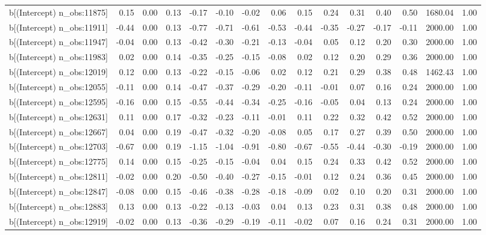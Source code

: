 \begin{table}[ht]
\begin{tabular}{rrrrrrrrrrrrrrr}
  b[(Intercept) n\_obs:11875] & 0.15 & 0.00 & 0.13 & -0.17 & -0.10 & -0.02 & 0.06 & 0.15 & 0.24 & 0.31 & 0.40 & 0.50 & 1680.04 & 1.00 \\ 
  b[(Intercept) n\_obs:11911] & -0.44 & 0.00 & 0.13 & -0.77 & -0.71 & -0.61 & -0.53 & -0.44 & -0.35 & -0.27 & -0.17 & -0.11 & 2000.00 & 1.00 \\ 
  b[(Intercept) n\_obs:11947] & -0.04 & 0.00 & 0.13 & -0.42 & -0.30 & -0.21 & -0.13 & -0.04 & 0.05 & 0.12 & 0.20 & 0.30 & 2000.00 & 1.00 \\ 
  b[(Intercept) n\_obs:11983] & 0.02 & 0.00 & 0.14 & -0.35 & -0.25 & -0.15 & -0.08 & 0.02 & 0.12 & 0.20 & 0.29 & 0.36 & 2000.00 & 1.00 \\ 
  b[(Intercept) n\_obs:12019] & 0.12 & 0.00 & 0.13 & -0.22 & -0.15 & -0.06 & 0.02 & 0.12 & 0.21 & 0.29 & 0.38 & 0.48 & 1462.43 & 1.00 \\ 
  b[(Intercept) n\_obs:12055] & -0.11 & 0.00 & 0.14 & -0.47 & -0.37 & -0.29 & -0.20 & -0.11 & -0.01 & 0.07 & 0.16 & 0.24 & 2000.00 & 1.00 \\ 
  b[(Intercept) n\_obs:12595] & -0.16 & 0.00 & 0.15 & -0.55 & -0.44 & -0.34 & -0.25 & -0.16 & -0.05 & 0.04 & 0.13 & 0.24 & 2000.00 & 1.00 \\ 
  b[(Intercept) n\_obs:12631] & 0.11 & 0.00 & 0.17 & -0.32 & -0.23 & -0.11 & -0.01 & 0.11 & 0.22 & 0.32 & 0.42 & 0.52 & 2000.00 & 1.00 \\ 
  b[(Intercept) n\_obs:12667] & 0.04 & 0.00 & 0.19 & -0.47 & -0.32 & -0.20 & -0.08 & 0.05 & 0.17 & 0.27 & 0.39 & 0.50 & 2000.00 & 1.00 \\ 
  b[(Intercept) n\_obs:12703] & -0.67 & 0.00 & 0.19 & -1.15 & -1.04 & -0.91 & -0.80 & -0.67 & -0.55 & -0.44 & -0.30 & -0.19 & 2000.00 & 1.00 \\ 
  b[(Intercept) n\_obs:12775] & 0.14 & 0.00 & 0.15 & -0.25 & -0.15 & -0.04 & 0.04 & 0.15 & 0.24 & 0.33 & 0.42 & 0.52 & 2000.00 & 1.00 \\ 
  b[(Intercept) n\_obs:12811] & -0.02 & 0.00 & 0.20 & -0.50 & -0.40 & -0.27 & -0.15 & -0.01 & 0.12 & 0.24 & 0.36 & 0.45 & 2000.00 & 1.00 \\ 
  b[(Intercept) n\_obs:12847] & -0.08 & 0.00 & 0.15 & -0.46 & -0.38 & -0.28 & -0.18 & -0.09 & 0.02 & 0.10 & 0.20 & 0.31 & 2000.00 & 1.00 \\ 
  b[(Intercept) n\_obs:12883] & 0.13 & 0.00 & 0.13 & -0.22 & -0.13 & -0.03 & 0.04 & 0.13 & 0.23 & 0.31 & 0.38 & 0.48 & 2000.00 & 1.00 \\ 
  b[(Intercept) n\_obs:12919] & -0.02 & 0.00 & 0.13 & -0.36 & -0.29 & -0.19 & -0.11 & -0.02 & 0.07 & 0.16 & 0.24 & 0.31 & 2000.00 & 1.00 \\ 

\end{tabular}
\end{table}
